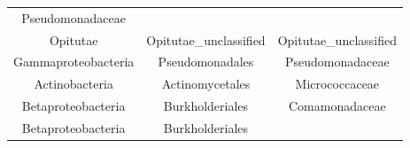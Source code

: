 \documentclass[]{article}
\begin{document}
\begin{longtable}[]{@{}ccc@{}}
\begin{minipage}[t]{0.30\columnwidth}
Pseudomonadaceae\strut
\end{minipage}\tabularnewline
\begin{minipage}[t]{0.28\columnwidth}\centering\strut
Opitutae\strut
\end{minipage} & \begin{minipage}[t]{0.30\columnwidth}\centering\strut
Opitutae\_unclassified\strut
\end{minipage} & \begin{minipage}[t]{0.30\columnwidth}\centering\strut
Opitutae\_unclassified\strut
\end{minipage}\tabularnewline
\begin{minipage}[t]{0.28\columnwidth}\centering\strut
Gammaproteobacteria\strut
\end{minipage} & \begin{minipage}[t]{0.30\columnwidth}\centering\strut
Pseudomonadales\strut
\end{minipage} & \begin{minipage}[t]{0.30\columnwidth}\centering\strut
Pseudomonadaceae\strut
\end{minipage}\tabularnewline
\begin{minipage}[t]{0.28\columnwidth}\centering\strut
Actinobacteria\strut
\end{minipage} & \begin{minipage}[t]{0.30\columnwidth}\centering\strut
Actinomycetales\strut
\end{minipage} & \begin{minipage}[t]{0.30\columnwidth}\centering\strut
Micrococcaceae\strut
\end{minipage}\tabularnewline
\begin{minipage}[t]{0.28\columnwidth}\centering\strut
Betaproteobacteria\strut
\end{minipage} & \begin{minipage}[t]{0.30\columnwidth}\centering\strut
Burkholderiales\strut
\end{minipage} & \begin{minipage}[t]{0.30\columnwidth}\centering\strut
Comamonadaceae\strut
\end{minipage}\tabularnewline
\begin{minipage}[t]{0.28\columnwidth}\centering\strut
Betaproteobacteria\strut
\end{minipage} & \begin{minipage}[t]{0.30\columnwidth}\centering\strut
Burkholderiales\strut
\end{minipage} & \begin{minipage}[t]{0.30\columnwidth}\centering\strut

\end{minipage}
\end{longtable}
\end{document}
